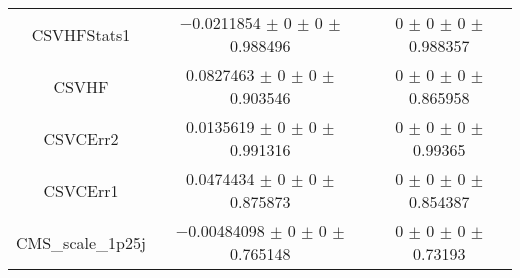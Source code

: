 \begin{table}
\begin{tabular}{ccc}
CSVHFStats1 & \num{-0.0211854} $\pm$ \num{0} $\pm$ \num{0} $\pm$ \num{0.988496} & \num{0} $\pm$ \num{0} $\pm$ \num{0} $\pm$ \num{0.988357}\\
CSVHF & \num{0.0827463} $\pm$ \num{0} $\pm$ \num{0} $\pm$ \num{0.903546} & \num{0} $\pm$ \num{0} $\pm$ \num{0} $\pm$ \num{0.865958}\\
CSVCErr2 & \num{0.0135619} $\pm$ \num{0} $\pm$ \num{0} $\pm$ \num{0.991316} & \num{0} $\pm$ \num{0} $\pm$ \num{0} $\pm$ \num{0.99365}\\
CSVCErr1 & \num{0.0474434} $\pm$ \num{0} $\pm$ \num{0} $\pm$ \num{0.875873} & \num{0} $\pm$ \num{0} $\pm$ \num{0} $\pm$ \num{0.854387}\\
CMS\_scale\_1p25j & \num{-0.00484098} $\pm$ \num{0} $\pm$ \num{0} $\pm$ \num{0.765148} & \num{0} $\pm$ \num{0} $\pm$ \num{0} $\pm$ \num{0.73193}\\
\bottomrule
\end{tabular}
\end{table}